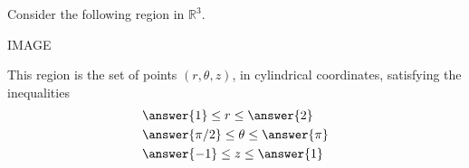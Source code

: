 \begin{problem}
Consider the following region in $\mathbb{R}^3$.

IMAGE

This region is the set of points $(r, \theta, z)$, in cylindrical coordinates, satisfying the inequalities
\begin{align*}
&\answer{1}\leq r\leq \answer{2}\\
&\answer{\pi/2}\leq\theta\leq\answer{\pi}\\
&\answer{-1}\leq z\leq\answer{1}
\end{align*}

\end{problem}